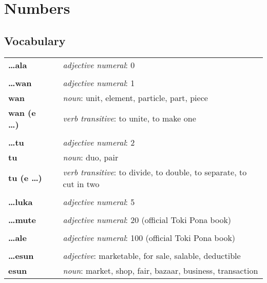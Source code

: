 \section{Numbers}
%
%
\subsection*{Vocabulary}
%
\begin{supertabular}{p{2,5cm}|ll}
%
\textbf{\dots ala} && \textit{adjective numeral}: 0 \\ %
 && \\ %
%
\textbf{\dots wan} && \textit{adjective numeral}: 1 \\ %
\textbf{wan} && \textit{noun}: unit, element, particle, part, piece \\ %
\textbf{wan (e \dots)} && \textit{verb transitive}: to unite, to make one \\ %
 && \\ %
%
\textbf{\dots tu} && \textit{adjective numeral}: 2 \\ %
\textbf{tu} && \textit{noun}: duo, pair \\ %
\textbf{tu (e \dots)} && \textit{verb transitive}: to divide, to double, to separate, to cut in two \\ %
 && \\ %
%
\textbf{\dots luka} && \textit{adjective numeral}: 5 \\ %
 && \\ %
%
\textbf{\dots mute} && \textit{adjective numeral}: 20 (official Toki Pona book) \\ %
 && \\ %
%
\textbf{\dots ale} && \textit{adjective numeral}: 100 (official Toki Pona book) \\ %
 && \\ %
%
\textbf{\dots esun} && \textit{adjective}: marketable, for sale, salable, deductible \\  %
\textbf{esun} && \textit{noun}: market, shop, fair, bazaar, business, transaction \\ %

\end{supertabular}
